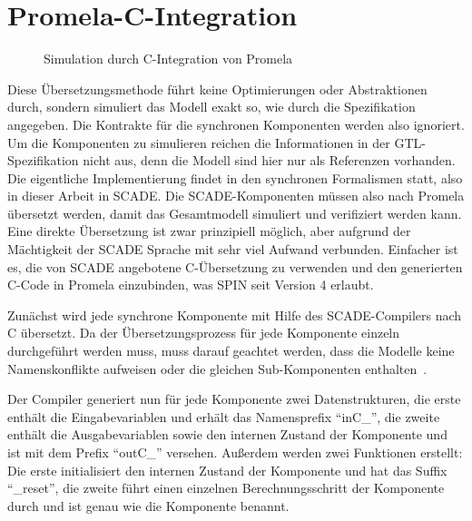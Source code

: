 \section{Promela-C-Integration}
\begin{figure}
  \centering
  \caption{Simulation durch C-Integration von Promela}
\end{figure}

Diese Übersetzungsmethode führt keine Optimierungen oder Abstraktionen durch, sondern simuliert das Modell exakt so, wie durch die Spezifikation angegeben.
Die Kontrakte für die synchronen Komponenten werden also ignoriert.
Um die Komponenten zu simulieren reichen die Informationen in der GTL-Spezifikation nicht aus, denn die Modell sind hier nur als Referenzen vorhanden.
Die eigentliche Implementierung findet in den synchronen Formalismen statt, also in dieser Arbeit in SCADE.
Die SCADE-Komponenten müssen also nach Promela übersetzt werden, damit das Gesamtmodell simuliert und verifiziert werden kann.
Eine direkte Übersetzung ist zwar prinzipiell möglich, aber aufgrund der Mächtigkeit der SCADE Sprache mit sehr viel Aufwand verbunden.
Einfacher ist es, die von SCADE angebotene C-Übersetzung zu verwenden und den generierten C-Code in Promela einzubinden, was SPIN seit Version 4 erlaubt.

Zunächst wird jede synchrone Komponente mit Hilfe des SCADE-Compilers nach C übersetzt.
Da der Übersetzungsprozess für jede Komponente einzeln durchgeführt werden muss, muss darauf geachtet werden, dass die Modelle keine Namenskonflikte aufweisen oder die gleichen Sub-Komponenten enthalten~\cite{scade_c_integration}.

Der Compiler generiert nun für jede Komponente zwei Datenstrukturen, die erste enthält die Eingabevariablen und erhält das Namensprefix "`inC\_"', die zweite enthält die Ausgabevariablen sowie den internen Zustand der Komponente und ist mit dem Prefix "`outC\_"' versehen.
Außerdem werden zwei Funktionen erstellt:
Die erste initialisiert den internen Zustand der Komponente und hat das Suffix "`\_reset"', die zweite führt einen einzelnen Berechnungsschritt der Komponente durch und ist genau wie die Komponente benannt.

